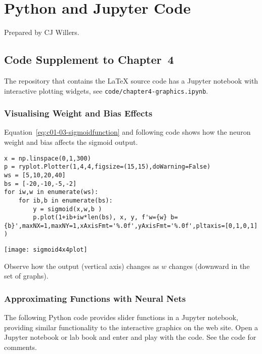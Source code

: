 
\chapter{Python and Jupyter Code}
\label{sec:PythonandJupyterCode}

Prepared by CJ Willers.


\section{Code Supplement to Chapter~4}
\label{sec:CodeSupplementtoChapter4}



The repository that contains the \LaTeX{} source code has a Jupyter notebook with interactive plotting widgets, see \lstinline{code/chapter4-graphics.ipynb}.

\subsection{Visualising Weight and Bias Effects}
\label{sec:VisualisingWeightandBiasEffects}

Equation~\ref{eq:c01-03-sigmoidfunction} and following code shows how the neuron weight and bias affects the sigmoid output.

\begin{lstlisting}
x = np.linspace(0,1,300)
p = ryplot.Plotter(1,4,4,figsize=(15,15),doWarning=False)
ws = [5,10,20,40]
bs = [-20,-10,-5,-2]
for iw,w in enumerate(ws):
    for ib,b in enumerate(bs):
        y = sigmoid(x,w,b )
        p.plot(1+ib+iw*len(bs), x, y, f'w={w} b={b}',maxNX=1,maxNY=1,xAxisFmt='%.0f',yAxisFmt='%.0f',pltaxis=[0,1,0,1] )
\end{lstlisting}

{\centering \texttt{[image: sigmoid4x4plot]} \par}

Observe how the output (vertical axis) changes as $w$ changes (downward in the set of graphs).


\subsection{Approximating Functions with Neural Nets}
\label{sec:ApproximatingFunctionswithNeuralNets}

The following Python code provides slider functions in a Jupyter notebook, providing similar functionality to the interactive graphics on the web site.  Open a Jupyter notebook or lab book and enter and play with the code.  See the code for comments.

